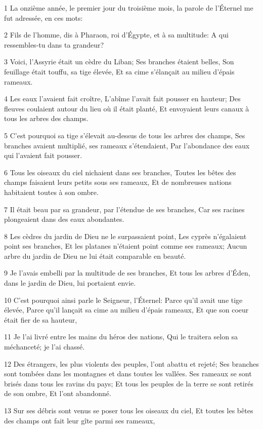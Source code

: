 \par 1 La onzième année, le premier jour du troisième mois, la parole de l'Éternel me fut adressée, en ces mots:
\par 2 Fils de l'homme, dis à Pharaon, roi d'Égypte, et à sa multitude: A qui ressembles-tu dans ta grandeur?
\par 3 Voici, l'Assyrie était un cèdre du Liban; Ses branches étaient belles, Son feuillage était touffu, sa tige élevée, Et sa cime s'élançait au milieu d'épais rameaux.
\par 4 Les eaux l'avaient fait croître, L'abîme l'avait fait pousser en hauteur; Des fleuves coulaient autour du lieu où il était planté, Et envoyaient leurs canaux à tous les arbres des champs.
\par 5 C'est pourquoi sa tige s'élevait au-dessus de tous les arbres des champs, Ses branches avaient multiplié, ses rameaux s'étendaient, Par l'abondance des eaux qui l'avaient fait pousser.
\par 6 Tous les oiseaux du ciel nichaient dans ses branches, Toutes les bêtes des champs faisaient leurs petits sous ses rameaux, Et de nombreuses nations habitaient toutes à son ombre.
\par 7 Il était beau par sa grandeur, par l'étendue de ses branches, Car ses racines plongeaient dans des eaux abondantes.
\par 8 Les cèdres du jardin de Dieu ne le surpassaient point, Les cyprès n'égalaient point ses branches, Et les platanes n'étaient point comme ses rameaux; Aucun arbre du jardin de Dieu ne lui était comparable en beauté.
\par 9 Je l'avais embelli par la multitude de ses branches, Et tous les arbres d'Éden, dans le jardin de Dieu, lui portaient envie.
\par 10 C'est pourquoi ainsi parle le Seigneur, l'Éternel: Parce qu'il avait une tige élevée, Parce qu'il lançait sa cime au milieu d'épais rameaux, Et que son coeur était fier de sa hauteur,
\par 11 Je l'ai livré entre les mains du héros des nations, Qui le traitera selon sa méchanceté; je l'ai chassé.
\par 12 Des étrangers, les plus violents des peuples, l'ont abattu et rejeté; Ses branches sont tombées dans les montagnes et dans toutes les vallées. Ses rameaux se sont brisés dans tous les ravins du pays; Et tous les peuples de la terre se sont retirés de son ombre, Et l'ont abandonné.
\par 13 Sur ses débris sont venus se poser tous les oiseaux du ciel, Et toutes les bêtes des champs ont fait leur gîte parmi ses rameaux,
